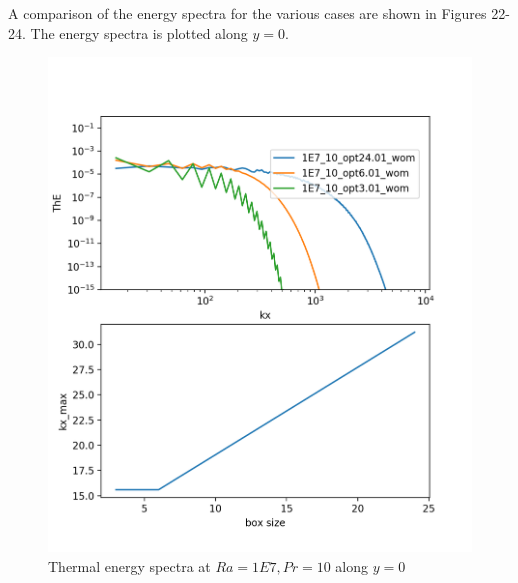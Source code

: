 \documentclass[12pt]{article}
\begin{document}
     A comparison of the energy spectra for the various cases are shown in Figures 22-24. The energy spectra is plotted along $y = 0$. 
     
      \begin{figure}[!htb]
      	\includegraphics[width=\linewidth]{ThE_1E7_10.png}
      	\caption{ Thermal energy spectra at $Ra = 1E7, Pr =10$ along $y = 0$}
      	\label{fig:fig22}
      \end{figure}
      
       \clearpage
     
\end{document}
